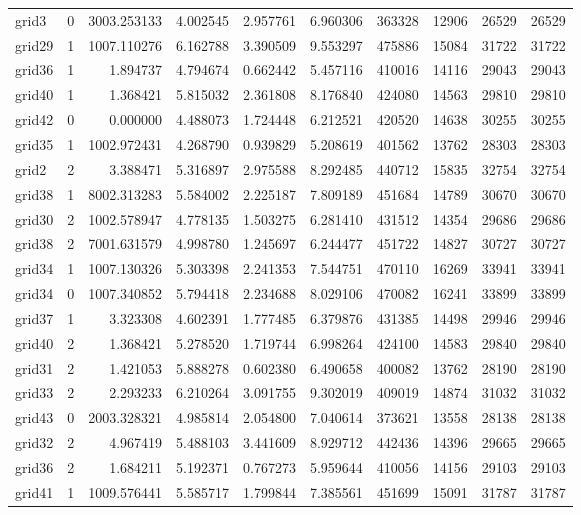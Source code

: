 \begin{longtable}{|l|r|r|r|r|r|r|r|r|r|}
grid3 & 0 & 3003.253133 & 4.002545 & 2.957761 & 6.960306 & 363328 & 12906 & 26529 & 26529 \\
grid29 & 1 & 1007.110276 & 6.162788 & 3.390509 & 9.553297 & 475886 & 15084 & 31722 & 31722 \\
grid36 & 1 & 1.894737 & 4.794674 & 0.662442 & 5.457116 & 410016 & 14116 & 29043 & 29043 \\
grid40 & 1 & 1.368421 & 5.815032 & 2.361808 & 8.176840 & 424080 & 14563 & 29810 & 29810 \\
grid42 & 0 & 0.000000 & 4.488073 & 1.724448 & 6.212521 & 420520 & 14638 & 30255 & 30255 \\
grid35 & 1 & 1002.972431 & 4.268790 & 0.939829 & 5.208619 & 401562 & 13762 & 28303 & 28303 \\
grid2 & 2 & 3.388471 & 5.316897 & 2.975588 & 8.292485 & 440712 & 15835 & 32754 & 32754 \\
grid38 & 1 & 8002.313283 & 5.584002 & 2.225187 & 7.809189 & 451684 & 14789 & 30670 & 30670 \\
grid30 & 2 & 1002.578947 & 4.778135 & 1.503275 & 6.281410 & 431512 & 14354 & 29686 & 29686 \\
grid38 & 2 & 7001.631579 & 4.998780 & 1.245697 & 6.244477 & 451722 & 14827 & 30727 & 30727 \\
grid34 & 1 & 1007.130326 & 5.303398 & 2.241353 & 7.544751 & 470110 & 16269 & 33941 & 33941 \\
grid34 & 0 & 1007.340852 & 5.794418 & 2.234688 & 8.029106 & 470082 & 16241 & 33899 & 33899 \\
grid37 & 1 & 3.323308 & 4.602391 & 1.777485 & 6.379876 & 431385 & 14498 & 29946 & 29946 \\
grid40 & 2 & 1.368421 & 5.278520 & 1.719744 & 6.998264 & 424100 & 14583 & 29840 & 29840 \\
grid31 & 2 & 1.421053 & 5.888278 & 0.602380 & 6.490658 & 400082 & 13762 & 28190 & 28190 \\
grid33 & 2 & 2.293233 & 6.210264 & 3.091755 & 9.302019 & 409019 & 14874 & 31032 & 31032 \\
grid43 & 0 & 2003.328321 & 4.985814 & 2.054800 & 7.040614 & 373621 & 13558 & 28138 & 28138 \\
grid32 & 2 & 4.967419 & 5.488103 & 3.441609 & 8.929712 & 442436 & 14396 & 29665 & 29665 \\
grid36 & 2 & 1.684211 & 5.192371 & 0.767273 & 5.959644 & 410056 & 14156 & 29103 & 29103 \\
grid41 & 1 & 1009.576441 & 5.585717 & 1.799844 & 7.385561 & 451699 & 15091 & 31787 & 31787 \\

\end{longtable}
